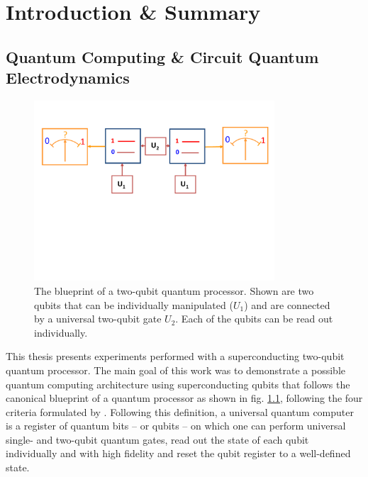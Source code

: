 \chapter{Introduction \& Summary}


\section{Quantum Computing \& Circuit Quantum Electrodynamics}

\begin{figure}
	\centering
		\includegraphics[width=0.8\textwidth]{./material/papers/grover/submission1/Fig1}
	\caption[Blueprint of a two-qubit quantum processor]{The blueprint of a two-qubit quantum processor. Shown are two qubits that can be individually manipulated ($U_1$) and are connected by a universal two-qubit gate $U_2$. Each of the qubits can be read out individually.}
	\label{fig:qubit_processor_blueprint}
\end{figure}

This thesis presents experiments performed with a superconducting two-qubit quantum processor. The main goal of this work was to demonstrate a possible quantum computing architecture using superconducting qubits that follows the canonical blueprint of a quantum processor as shown in fig. \ref{fig:qubit_processor_blueprint}, following the four criteria formulated by \cite{divincenzo_physical_2000}. Following this definition, a universal quantum computer is a register of quantum bits -- or qubits -- on which one can perform universal single- and two-qubit quantum gates, read out the state of each qubit individually and with high fidelity and reset the qubit register to a well-defined state.

